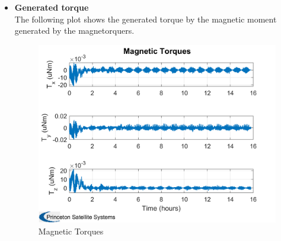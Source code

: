 \begin{itemize}
    \item \textbf{Generated torque}\\
    The following plot shows the generated torque by the magnetic moment generated by the magnetorquers.
    \begin{figure}[H]
        \centering
        \includegraphics[width=0.48\linewidth]{res/img/Nadir_EKF/Simulations/Magnetic Torques.png}
        \caption{Magnetic Torques}
    \end{figure}


\end{itemize}
